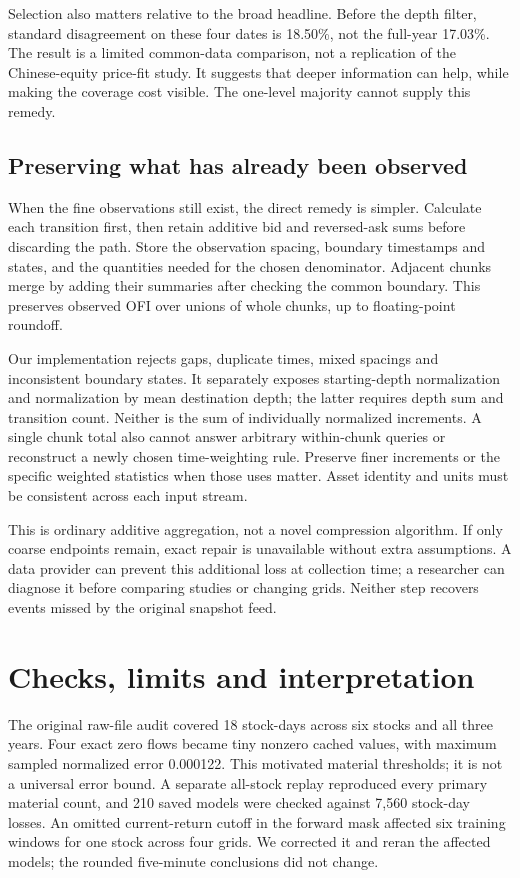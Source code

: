 \documentclass[11pt]{article}
\begin{document}
Selection also matters relative to the broad headline. Before the depth filter, standard disagreement on these four dates is 18.50\%, not the full-year 17.03\%. The result is a limited common-data comparison, not a replication of the Chinese-equity price-fit study. It suggests that deeper information can help, while making the coverage cost visible. The one-level majority cannot supply this remedy.

\subsection{Preserving what has already been observed}
When the fine observations still exist, the direct remedy is simpler. Calculate each transition first, then retain additive bid and reversed-ask sums before discarding the path. Store the observation spacing, boundary timestamps and states, and the quantities needed for the chosen denominator. Adjacent chunks merge by adding their summaries after checking the common boundary. This preserves observed OFI over unions of whole chunks, up to floating-point roundoff.

Our implementation rejects gaps, duplicate times, mixed spacings and inconsistent boundary states. It separately exposes starting-depth normalization and normalization by mean destination depth; the latter requires depth sum and transition count. Neither is the sum of individually normalized increments. A single chunk total also cannot answer arbitrary within-chunk queries or reconstruct a newly chosen time-weighting rule. Preserve finer increments or the specific weighted statistics when those uses matter. Asset identity and units must be consistent across each input stream.

This is ordinary additive aggregation, not a novel compression algorithm. If only coarse endpoints remain, exact repair is unavailable without extra assumptions. A data provider can prevent this additional loss at collection time; a researcher can diagnose it before comparing studies or changing grids. Neither step recovers events missed by the original snapshot feed.

\section{Checks, limits and interpretation}
The original raw-file audit covered 18 stock-days across six stocks and all three years. Four exact zero flows became tiny nonzero cached values, with maximum sampled normalized error 0.000122. This motivated material thresholds; it is not a universal error bound. A separate all-stock replay reproduced every primary material count, and 210 saved models were checked against 7,560 stock-day losses. An omitted current-return cutoff in the forward mask affected six training windows for one stock across four grids. We corrected it and reran the affected models; the rounded five-minute conclusions did not change.
\end{document}
